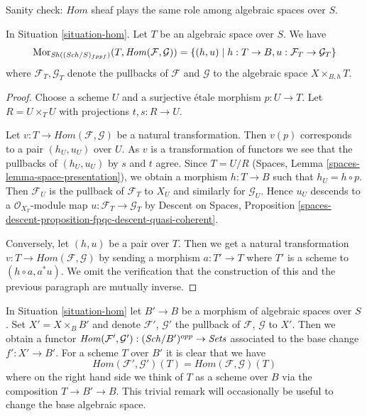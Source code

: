 \noindent
Sanity check: $\mathit{Hom}$ sheaf plays the same role among algebraic spaces
over $S$.

\begin{lemma}
\label{lemma-extend-hom-to-spaces}
In Situation \ref{situation-hom}. Let $T$ be an algebraic space over $S$.
We have
$$
\mathop{\mathrm{Mor}}\nolimits_{\mathop{\mathit{Sh}}\nolimits((\mathit{Sch}/S)_{fppf})}(T, \mathit{Hom}(\mathcal{F}, \mathcal{G})) =
\{(h, u) \mid h : T \to B, u : \mathcal{F}_T \to \mathcal{G}_T\}
$$
where $\mathcal{F}_T, \mathcal{G}_T$ denote the pullbacks of $\mathcal{F}$
and $\mathcal{G}$ to the algebraic space $X \times_{B, h} T$.
\end{lemma}

\begin{proof}
Choose a scheme $U$ and a surjective \'etale morphism $p : U \to T$.
Let $R = U \times_T U$ with projections $t, s : R \to U$.

\medskip\noindent
Let $v : T \to \mathit{Hom}(\mathcal{F}, \mathcal{G})$
be a natural transformation. Then $v(p)$ corresponds to a pair
$(h_U, u_U)$ over $U$. As $v$ is a transformation of functors we see
that the pullbacks of $(h_U, u_U)$ by $s$ and $t$ agree.
Since $T = U/R$ (Spaces, Lemma \ref{spaces-lemma-space-presentation}),
we obtain a morphism $h : T \to B$ such that
$h_U = h \circ p$. Then $\mathcal{F}_U$ is the pullback of
$\mathcal{F}_T$ to $X_U$ and similarly for $\mathcal{G}_U$.
Hence $u_U$ descends to a $\mathcal{O}_{X_T}$-module map
$u : \mathcal{F}_T \to \mathcal{G}_T$ by
Descent on Spaces, Proposition
\ref{spaces-descent-proposition-fpqc-descent-quasi-coherent}.

\medskip\noindent
Conversely, let $(h, u)$ be a pair over $T$. Then we get a natural
transformation $v : T \to \mathit{Hom}(\mathcal{F}, \mathcal{G})$
by sending a morphism $a : T' \to T$ where $T'$ is a scheme
to $(h \circ a, a^*u)$. We omit the verification that the construction
of this and the previous paragraph are mutually inverse.
\end{proof}

\begin{remark}
\label{remark-hom-base-change}
In Situation \ref{situation-hom} let $B' \to B$ be a morphism of
algebraic spaces over $S$. Set $X' = X \times_B B'$ and denote
$\mathcal{F}'$, $\mathcal{G}'$ the pullback of
$\mathcal{F}$, $\mathcal{G}$ to $X'$. Then we obtain a functor
$\mathit{Hom}(\mathcal{F}', \mathcal{G}') : (\mathit{Sch}/B')^{opp} \to \textit{Sets}$
associated to the base change $f' : X' \to B'$. For a scheme $T$ over $B'$
it is clear that we have
$$
\mathit{Hom}(\mathcal{F}', \mathcal{G}')(T) =
\mathit{Hom}(\mathcal{F}, \mathcal{G})(T)
$$
where on the right hand side we think of $T$ as a scheme over $B$
via the composition $T \to B' \to B$. This trivial remark
will occasionally be useful to change the base algebraic space.
\end{remark}

